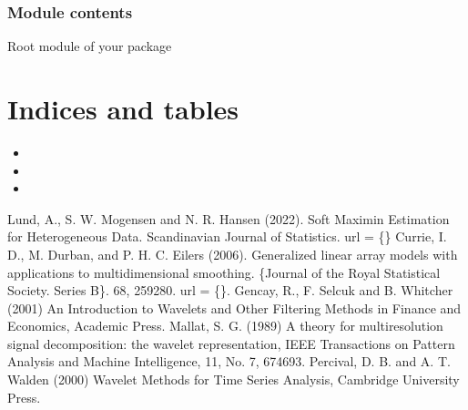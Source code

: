 \documentclass[letterpaper,10pt,english]{sphinxmanual}
\begin{document}
\subsection{Module contents}
\label{\detokenize{pysmme:module-pysmme}}\label{\detokenize{pysmme:module-contents}}
\sphinxAtStartPar
Root module of your package


\chapter{Indices and tables}
\label{\detokenize{index:indices-and-tables}}\begin{itemize}
\item {} 
\sphinxAtStartPar
{}

\item {} 
\sphinxAtStartPar
{}

\item {} 
\sphinxAtStartPar
{}

\end{itemize}

\begin{sphinxthebibliography}{1}
\sphinxAtStartPar
Lund, A., S. W. Mogensen and N. R. Hansen (2022). Soft Maximin Estimation for
Heterogeneous Data. Scandinavian Journal of Statistics. url = \{\}
\sphinxAtStartPar
Currie, I. D., M. Durban, and P. H. C. Eilers (2006). Generalized linear
array models with applications to multidimensional smoothing.
\{Journal of the Royal Statistical Society. Series B\}. 68, 
259\sphinxhyphen{}280. url = \{\}.
\sphinxAtStartPar
Gencay, R., F. Selcuk and B. Whitcher (2001) An Introduction to Wavelets and
Other Filtering Methods in Finance and Economics, Academic Press.
\sphinxAtStartPar
Mallat, S. G. (1989) A theory for multiresolution signal decomposition: the
wavelet representation, IEEE Transactions on Pattern Analysis and Machine
Intelligence, 11, No. 7, 674\sphinxhyphen{}693.
\sphinxAtStartPar
Percival, D. B. and A. T. Walden (2000) Wavelet Methods for Time Series
Analysis, Cambridge University Press.
\end{sphinxthebibliography}
\end{document}
